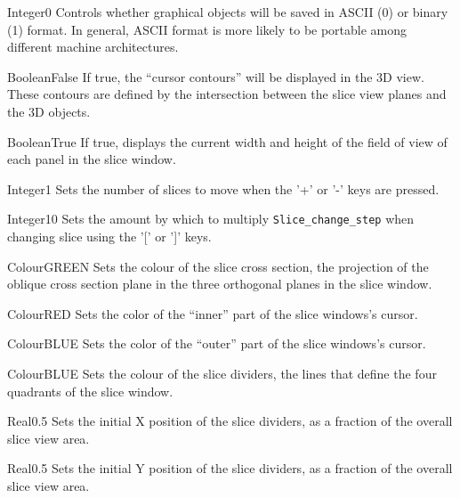  {Integer}{0} {Controls whether graphical
 objects will be saved in ASCII (0) or binary (1) format. In general,
 ASCII format is more likely to be portable among different machine
 architectures.}{}




{Boolean}{False}
{If true, the ``cursor contours'' will be displayed in the 3D
  view. These contours are defined by the intersection between the slice
  view planes and the 3D objects.}{}

{Boolean}{True}
{If true, displays the current width and height of the field of view of
  each panel in the slice window.}{}

{Integer}{1}
{Sets the number of slices to move when the '+' or '-' keys are
  pressed.}{}

{Integer}{10}
{Sets the amount by which to multiply {\tt Slice\_change\_step} when
  changing slice using the '[' or ']' keys.}{}

{Colour}{GREEN}
{Sets the colour of the slice cross section, the projection of the oblique cross section plane in the three orthogonal planes in the slice window.}{}

{Colour}{RED}
{Sets the color of the ``inner'' part of the slice windows's cursor.}{}

{Colour}{BLUE}
{Sets the color of the ``outer'' part of the slice windows's cursor.}{}

{Colour}{BLUE}
{Sets the colour of the slice dividers, the lines that define the four quadrants of the slice window.}{}

{Real}{0.5}
{Sets the initial X position of the slice dividers, as a fraction of the overall slice view area.}{}

{Real}{0.5}
{Sets the initial Y position of the slice dividers, as a fraction of the overall slice view area.}{}

